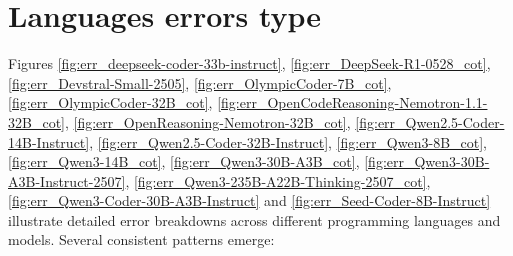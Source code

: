 \documentclass{llmxive}
\begin{document}
\section{Languages errors type}

Figures \ref{fig:err_deepseek-coder-33b-instruct}, \ref{fig:err_DeepSeek-R1-0528_cot}, \ref{fig:err_Devstral-Small-2505}, \ref{fig:err_OlympicCoder-7B_cot}, \ref{fig:err_OlympicCoder-32B_cot}, \ref{fig:err_OpenCodeReasoning-Nemotron-1.1-32B_cot}, \ref{fig:err_OpenReasoning-Nemotron-32B_cot}, \ref{fig:err_Qwen2.5-Coder-14B-Instruct}, \ref{fig:err_Qwen2.5-Coder-32B-Instruct}, \ref{fig:err_Qwen3-8B_cot}, 
\ref{fig:err_Qwen3-14B_cot},  
\ref{fig:err_Qwen3-30B-A3B_cot}, 
\ref{fig:err_Qwen3-30B-A3B-Instruct-2507}, \ref{fig:err_Qwen3-235B-A22B-Thinking-2507_cot}, \ref{fig:err_Qwen3-Coder-30B-A3B-Instruct}  and \ref{fig:err_Seed-Coder-8B-Instruct} illustrate 
detailed error breakdowns across different programming languages and models.
Several consistent patterns emerge:
\end{document}
